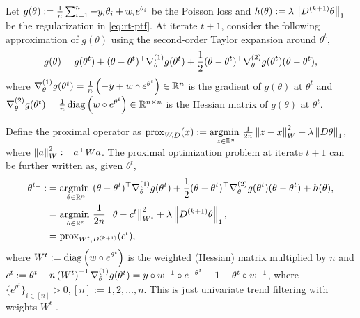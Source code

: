 Let $g(\theta):= \frac{1}{n} \sum_{i=1}^n -y_i\theta_i + w_i e^{\theta_i}$ be the Poisson loss and $h(\theta) := \lambda \left\lVert D^{(k+1)} \theta \right\rVert_1$ be the regularization in \eqref{eq:rt-ptf}. At iterate $t+1$, consider the following approximation of $g(\theta)$ using the second-order Taylor expansion around $\theta^t$, 
$$ g(\theta) = g(\theta^t) + (\theta - \theta^t)^{\top} \nabla^{(1)}_{\theta} g(\theta^t) + \frac{1}{2} (\theta - \theta^t)^{\top} \nabla^{(2)}_{\theta} g(\theta^t) (\theta - \theta^t), $$
where $\nabla^{(1)}_{\theta} g(\theta^t) = \frac{1}{n} \left(-y + w\circ e^{\theta^t}\right) \in \mathbb{R}^n$ is the gradient of $g(\theta)$ at $\theta^t$ and $\nabla^{(2)}_{\theta} g(\theta^t) = \frac{1}{n}\operatorname*{diag} \left(w \circ e^{\theta^t}\right) \in \mathbb{R}^{n\times n}$ is the Hessian matrix of $g(\theta)$ at $\theta^t$. %

Define the proximal operator as $\mathrm{prox}_{W,D} (x) := \underset{z\in\mathbb{R}^n}{\operatorname*{argmin}\ } \frac{1}{2n} \left\lVert z-x \right\rVert_W^2 + \lambda \left\lVert D\theta \right\rVert_1$, where $\left\lVert a \right\rVert_{W}^2 := a^{\top} {W} a$. The proximal optimization problem at iterate $t+1$ can be further written as, given $\theta^t$,
\begin{equation} \label{eq:prox-gauss}
    \begin{split}
        \theta^{t_+} :&= \underset{\theta\in\mathbb{R}^n}{\operatorname*{argmin}\ } (\theta - \theta^t)^{\top} \nabla^{(1)}_{\theta} g(\theta^t) + \frac{1}{2} (\theta - \theta^t)^{\top} \nabla^{(2)}_{\theta} g(\theta^t) (\theta - \theta^t) + h(\theta), \\
        &= \underset{\theta\in\mathbb{R}^n}{\operatorname*{argmin}\ } \frac{1}{2n} \left\lVert \theta - c^{t} \right\rVert_{W^t}^2 + \lambda \left\lVert D^{(k+1)}\theta \right\rVert_1, \\
        &= \mathrm{prox}_{W^t,D^{(k+1)}} (c^{t}),
    \end{split}
\end{equation}
where $W^t := \operatorname*{diag} \left(w\circ e^{\theta^t}\right)$ is the weighted (Hessian) matrix multiplied by $n$ and ${c^t} := \theta^t - n \left(W^{t}\right)^{-1} \nabla^{(1)}_{\theta} g(\theta^t) = y\circ w^{-1}\circ e^{-\theta^t} - \boldsymbol{1} + \theta^t\circ w^{-1}$, where $\{e^{\theta^t}\}_{i\in[n]} > 0, [n]:=1,2,\dots,n$.
This is just univariate trend filtering with weights $W^t$ \citep{tibshirani2014adaptive}. 

